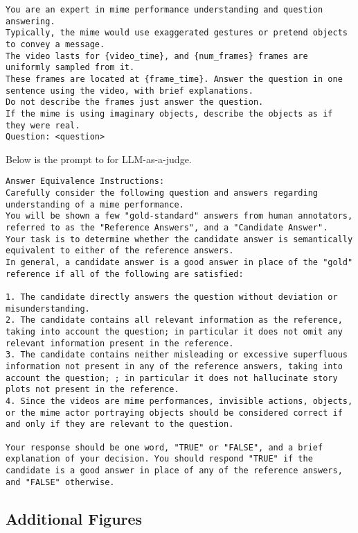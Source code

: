 \begin{lstlisting}[style=markdownstyle]
You are an expert in mime performance understanding and question answering. 
Typically, the mime would use exaggerated gestures or pretend objects to convey a message.
The video lasts for {video_time}, and {num_frames} frames are uniformly sampled from it.
These frames are located at {frame_time}. Answer the question in one sentence using the video, with brief explanations. 
Do not describe the frames just answer the question. 
If the mime is using imaginary objects, describe the objects as if they were real.
Question: <question>
\end{lstlisting}

Below is the prompt to {\gpt} for LLM-as-a-judge.

\begin{lstlisting}[style=markdownstyle]
Answer Equivalence Instructions:
Carefully consider the following question and answers regarding understanding of a mime performance.
You will be shown a few "gold-standard" answers from human annotators, referred to as the "Reference Answers", and a "Candidate Answer".
Your task is to determine whether the candidate answer is semantically equivalent to either of the reference answers.
In general, a candidate answer is a good answer in place of the "gold" reference if all of the following are satisfied:

1. The candidate directly answers the question without deviation or misunderstanding.
2. The candidate contains all relevant information as the reference, taking into account the question; in particular it does not omit any relevant information present in the reference.
3. The candidate contains neither misleading or excessive superfluous information not present in any of the reference answers, taking into account the question; ; in particular it does not hallucinate story plots not present in the reference.
4. Since the videos are mime performances, invisible actions, objects, or the mime actor portraying objects should be considered correct if and only if they are relevant to the question.

Your response should be one word, "TRUE" or "FALSE", and a brief explanation of your decision. You should respond "TRUE" if the candidate is a good answer in place of any of the reference answers, and "FALSE" otherwise.
\end{lstlisting}

\subsection{Additional Figures}\label{app:add_fig}

